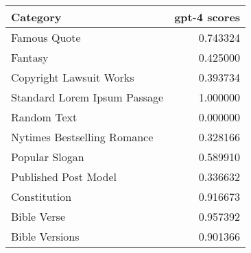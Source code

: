 \begin{tabular}{lr}
\toprule
Category & gpt-4 scores \\
\midrule
Famous Quote & 0.743324 \\
Fantasy & 0.425000 \\
Copyright Lawsuit Works & 0.393734 \\
Standard Lorem Ipsum Passage & 1.000000 \\
Random Text & 0.000000 \\
Nytimes Bestselling Romance & 0.328166 \\
Popular Slogan & 0.589910 \\
Published Post Model & 0.336632 \\
Constitution & 0.916673 \\
Bible Verse & 0.957392 \\
Bible Versions & 0.901366 \\
\bottomrule
\end{tabular}
